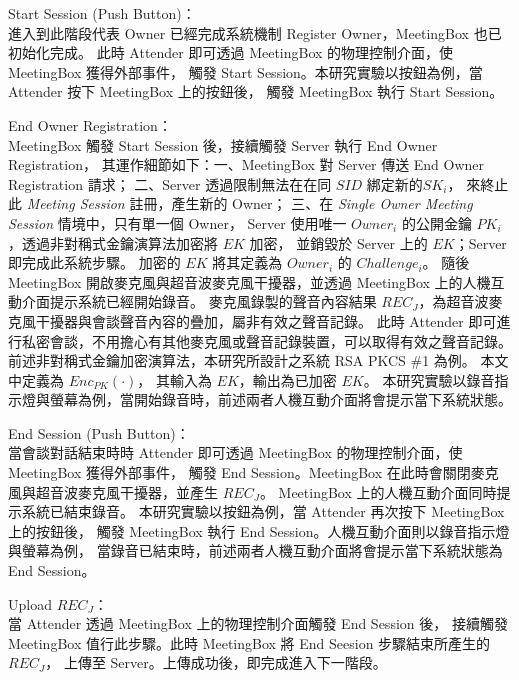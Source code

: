 \begin{steps}
    \item Start Session (Push Button)：\\
        進入到此階段代表 Owner 已經完成系統機制 Register Owner，MeetingBox 也已初始化完成。
        此時 Attender 即可透過 MeetingBox 的物理控制介面，使 MeetingBox 獲得外部事件，
        觸發 Start Session。本研究實驗以按鈕為例，當 Attender 按下 MeetingBox 上的按鈕後，
        觸發 MeetingBox 執行 Start Session。

    \item End Owner Registration：\\
        MeetingBox 觸發 Start Session 後，接續觸發 Server 執行 End Owner Registration，
        其運作細節如下：一、MeetingBox 對 Server 傳送 End Owner Registration 請求；
        二、Server 透過限制無法在在同 $SID$ 綁定新的$SK_{i}$，
        來終止此 {\it Meeting Session} 註冊，產生新的 Owner；
        三、在 {\it Single Owner Meeting Session} 情境中，只有單一個 Owner，
        Server 使用唯一 $Owner_{i}$ 的公開金鑰 $PK_{i}$，透過非對稱式金鑰演算法加密將 $EK$ 加密，
        並銷毀於 Server 上的 $EK$；Server 即完成此系統步驟。
        加密的 $EK$ 將其定義為 $Owner_{i}$ 的 $Challenge_{i}$。
        隨後 MeetingBox 開啟麥克風與超音波麥克風干擾器，並透過 MeetingBox 上的人機互動介面提示系統已經開始錄音。
        麥克風錄製的聲音內容結果 $REC_{J}$，為超音波麥克風干擾器與會談聲音內容的疊加，屬非有效之聲音記錄。
        此時 Attender 即可進行私密會談，不用擔心有其他麥克風或聲音記錄裝置，可以取得有效之聲音記錄。
        前述非對稱式金鑰加密演算法，本研究所設計之系統 RSA PKCS \#1 為例。 本文中定義為 $Enc_{PK}(·)$，
        其輸入為 $EK$，輸出為已加密 $EK$。
        本研究實驗以錄音指示燈與螢幕為例，當開始錄音時，前述兩者人機互動介面將會提示當下系統狀態。

    \item End Session (Push Button)：\\
        當會談對話結束時時 Attender 即可透過 MeetingBox 的物理控制介面，使 MeetingBox 獲得外部事件，
        觸發 End Session。MeetingBox 在此時會關閉麥克風與超音波麥克風干擾器，並產生 $REC_{J}$。
        MeetingBox 上的人機互動介面同時提示系統已結束錄音。
        本研究實驗以按鈕為例，當 Attender 再次按下 MeetingBox 上的按鈕後，
        觸發 MeetingBox 執行 End Session。人機互動介面則以錄音指示燈與螢幕為例，
        當錄音已結束時，前述兩者人機互動介面將會提示當下系統狀態為 End Session。

    \item Upload $REC_{J}$：\\
        當 Attender 透過 MeetingBox 上的物理控制介面觸發 End Session 後，
        接續觸發 MeetingBox 值行此步驟。此時 MeetingBox 將 End Seesion 步驟結束所產生的 $REC_{J}$，
        上傳至 Server。上傳成功後，即完成進入下一階段。
\end{steps}


